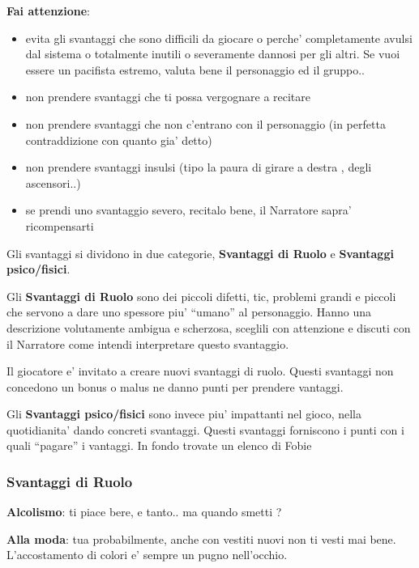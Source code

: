 \documentclass[a4paper,11pt,twoside,openany]{dndbook}
\begin{document}
{\textbf{Fai attenzione}:

\begin{itemize}
\item 
evita gli svantaggi che sono difficili da giocare o perche' completamente avulsi dal sistema o totalmente inutili o severamente dannosi per gli altri. Se vuoi essere un pacifista estremo, valuta bene il personaggio ed il gruppo.. 
\item 
non prendere svantaggi che ti possa vergognare a recitare 
\item 
non prendere svantaggi che non c'entrano con il personaggio (in perfetta contraddizione con quanto gia' detto) 
\item 
non prendere svantaggi insulsi (tipo la paura di girare a destra , degli ascensori..) 
\item 
se prendi uno svantaggio severo, recitalo bene, il Narratore sapra' ricompensarti 
\end{itemize}

Gli svantaggi si dividono in due categorie, \textbf{Svantaggi di Ruolo} e \textbf{Svantaggi psico/fisici}. 

Gli \textbf{Svantaggi di Ruolo} sono dei piccoli difetti, tic, problemi grandi e piccoli che servono a dare uno spessore piu' ``umano'' al personaggio. Hanno una descrizione volutamente ambigua e scherzosa, sceglili con attenzione e discuti con il Narratore come intendi interpretare questo svantaggio.

Il giocatore e' invitato a creare nuovi svantaggi di ruolo. Questi svantaggi non concedono un bonus o malus ne danno punti per prendere vantaggi.

\bigskip

Gli \textbf{Svantaggi psico/fisici} sono invece piu' impattanti nel gioco, nella quotidianita' dando concreti svantaggi. Questi svantaggi forniscono i punti con i quali ``pagare'' i vantaggi. In fondo trovate un elenco di Fobie

\pagebreak

\subsubsection{Svantaggi di Ruolo}

\bigskip

\textbf{Alcolismo}: ti piace bere, e tanto.. ma quando smetti ?

\textbf{Alla moda}: tua probabilmente, anche con vestiti nuovi non ti vesti mai bene. L'accostamento di colori e' sempre un pugno nell'occhio.

}
\end{document}
